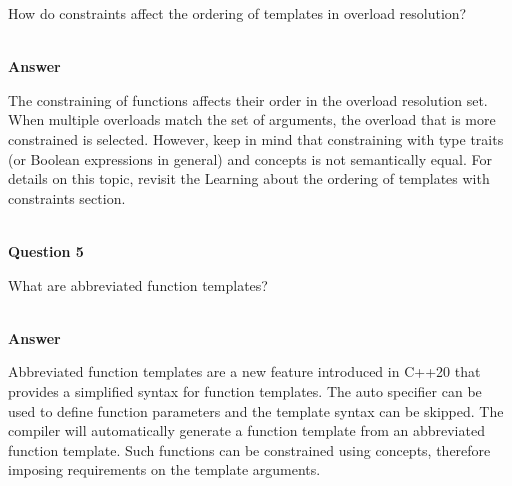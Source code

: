 How do constraints affect the ordering of templates in overload resolution?

\hspace*{\fill} \\ %
\noindent
\textbf{Answer}

The constraining of functions affects their order in the overload resolution set. When multiple overloads match the set of arguments, the overload that is more constrained is selected. However, keep in mind that constraining with type traits (or Boolean expressions in general) and concepts is not semantically equal. For details on this topic, revisit the Learning about the ordering of templates with constraints section.

\hspace*{\fill} \\ %
\noindent
\textbf{Question 5}

What are abbreviated function templates?

\hspace*{\fill} \\ %
\noindent
\textbf{Answer}

Abbreviated function templates are a new feature introduced in C++20 that provides a simplified syntax for function templates. The auto specifier can be used to define function parameters and the template syntax can be skipped. The compiler will automatically generate a function template from an abbreviated function template. Such functions can be constrained using concepts, therefore imposing requirements on the template arguments.












